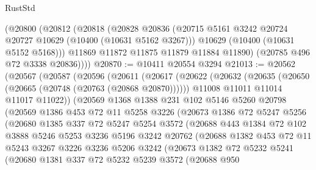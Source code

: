 \begin{lexlean}{RustStd}
\begin{coremodule}
{\begin{coremodule}
{{{{{{{{{{{{{{{{{{{{{{{{{      (@20800
        (@20812
          (@20818
            (@20828
              @20836
              (@20715 @5161 @3242 @20724 @20727 @10629 (@10400 (@10631 @5162 @3267)))
              @10629
              (@10400 (@10631 @5152 @5168)))
            @11869
            @11872
            @11875
            @11879
            @11884
            @11890)
          (@20785 @496 @72 @3338 @20836))))
@20870 := @10411 @20554 @3294
@21013 := @20562
    (@20567
      (@20587
        (@20596
          (@20611
            (@20617
              (@20622
                (@20632
                  (@20635 (@20650 (@20665 (@20748 (@20763 (@20868 @20870))))))
                  @11008
                  @11011
                  @11014
                  @11017
                  @11022))
              (@20569
                @1368
                @1388
                @231
                @102
                @5146
                @5260
                @20798
                (@20569
                  @1386
                  @453
                  @72
                  @11
                  @5258
                  @3226
                  (@20673
                    @1386
                    @72
                    @5247
                    @5256
                    (@20680
                      @1385
                      @337
                      @72
                      @5247
                      @5254
                      @3572
                      (@20688
                        @443
                        @1384
                        @72
                        @102
                        @3888
                        @5246
                        @5253
                        @3236
                        @5196
                        @3242
                        @20762
                        (@20688
                          @1382
                          @453
                          @72
                          @11
                          @5243
                          @3267
                          @3226
                          @3236
                          @5206
                          @3242
                          (@20673
                            @1382
                            @72
                            @5232
                            @5241
                            (@20680
                              @1381
                              @337
                              @72
                              @5232
                              @5239
                              @3572
                              (@20688
                                @950
}}}}}}}}}}}}}}}}}}}}}}}}}
\end{coremodule}}
\end{coremodule}
\end{lexlean}

